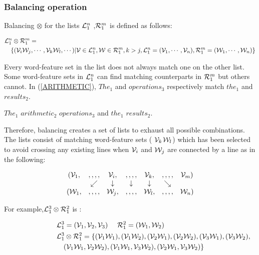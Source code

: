 \subsubsection{Balancing operation}

Balancing $\otimes$ for the lists ${\cal L}_{1}^{n}$
,${\cal R}_{1}^{m}$ is defined as follows:

\vspace{-6mm}
\begin{eqnarray*}
\lefteqn{ {\cal L}_{1}^{n} \otimes {\cal R}_{1}^{m}  = }\\
& & \{({\cal V}_{i}{\cal W}_{j},\cdots,{\cal V}_{k}{\cal W}_{l},\cdots)|
{\cal V} \in {\cal L}_{1}^{n},{\cal W} \in {\cal R}_{1}^{m},  
  k > j, {\cal L}_{1}^{n} =  ({\cal V}_{1}, \cdots, {\cal V}_{n}),
{\cal R}_{1}^{m} =  ({\cal W}_{1}, \cdots, {\cal W}_{n})\}
\end{eqnarray*}



Every word-feature set in the list does not always match one on the
other list.  Some word-feature sets in ${\cal L}_{1}^{n}$ can find 
matching counterparts in ${\cal R}_{1}^{m}$ but others cannot.
In (\ref{ARITHMETIC}),
$The_{1}$ and $operations_{3}$ respectively match $the_{1}$ and
$results_{2}$. 
\mylistin
\item $The_{1}$ $arithmetic_{2}$ $operations_{3}$ and $the_{1}$ $results_{2}$.
\label{ARITHMETIC} 
\mylistend

Therefore, balancing creates a set of lists to
exhaust all possible combinations.  The lists consist of
matching word-feature sets ( ${\cal V}_{k}$${\cal W}_{l}$) which
has been selected to avoid crossing any existing lines when ${\cal
V}_{i}$ and ${\cal W}_{j}$ are connected by a line as in the following:

\[
\begin{array}{ccccccc}
({\cal V}_{1},&,,,,&{\cal V}_{i},&,,,,&{\cal V}_{k},&,,,,&{\cal
V}_{m}) \\ & \swarrow & \downarrow & \downarrow & \downarrow & \searrow
& \\ ({\cal W}_{1},&,,,,&{\cal W}_{j},&,,,,&{\cal W}_{l},&,,,,&{\cal
W}_{n})
\end{array}
\]

For example,${\cal L}_{1}^{3} \otimes {\cal R}_{1}^{2}$ is :

\vspace{-0.8cm}
\begin{eqnarray*}
\lefteqn{ {\cal L}_{1}^{3}   =  ({\cal V}_{1},{\cal V}_{2},{\cal V}_{3}) ~~~~
{\cal R}_{1}^{2}   =  ({\cal W}_{1}, {\cal W}_{2}) } \\
\lefteqn{ {\cal L}_{1}^{3} \otimes {\cal R}_{1}^{2}  = 
\{({\cal V}_{1}{\cal W}_{1}),({\cal V}_{1}{\cal W}_{2}),
({\cal V}_{2}{\cal W}_{1}),({\cal V}_{2}{\cal W}_{2}),  
 ({\cal V}_{3}{\cal W}_{1}),({\cal V}_{3}{\cal W}_{2}),}\\
& &
({\cal V}_{1}{\cal W}_{1},{\cal V}_{2}{\cal W}_{2}), 
({\cal V}_{1}{\cal W}_{1},{\cal V}_{3}{\cal W}_{2}), 
({\cal V}_{2}{\cal W}_{1},{\cal V}_{3}{\cal W}_{2})\} 
\end{eqnarray*}

